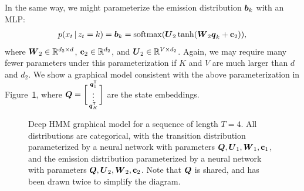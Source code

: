 \documentclass{article}
\begin{document}
In the same way, we might parameterize the emission distribution $\boldsymbol{b}_k$ with an MLP:
\begin{align*}
p(x_t \,|\, z_{t} = k) = \boldsymbol{b}_k = \operatorname*{softmax}(\boldsymbol{U}_2 \tanh(\boldsymbol{W}_2 \boldsymbol{q}_k + \mathbf{c}_2)),
\end{align*}
where $\boldsymbol{W}_2 \in \mathbb{R}^{d_2 \times d}$, $\mathbf{c}_2 \in \mathbb{R}^{d_2}$, and $\boldsymbol{U}_2 \in \mathbb{R}^{V \times d_2}$. Again, we may require many fewer parameters under this parameterization if $K$ and $V$ are much larger than $d$ and $d_2$. We show a graphical model consistent with the above parameterization in Figure~\ref{fig:deephmm}, where $\boldsymbol{Q} = \biggl[ \begin{smallmatrix} \boldsymbol{q}_1^{\mathsf{T}} \\ \vdots \\ \boldsymbol{q}_K^{\mathsf{T}}  \end{smallmatrix} \biggr]$ are the state embeddings.


\begin{figure}
\centering
{}
 \caption{Deep HMM graphical model for a sequence of length $T=4$. All distributions are categorical, with the transition distribution parameterized by a neural network with parameters $\boldsymbol{Q}, \boldsymbol{U}_1, \boldsymbol{W}_1, \mathbf{c}_1$, and the emission distribution parameterized by a neural network with parameters $\boldsymbol{Q}, \boldsymbol{U}_2, \boldsymbol{W}_2, \mathbf{c}_2$. Note that $\boldsymbol{Q}$ is shared, and has been drawn twice to simplify the diagram.}
 \label{fig:deephmm}
\end{figure}
\end{document}
